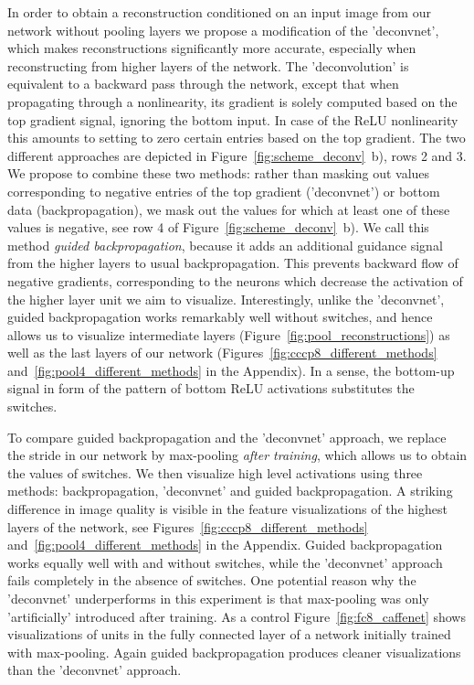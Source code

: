 \documentclass{article} \usepackage{iclr2015,times}
\begin{document}
In order to obtain a reconstruction conditioned on an input image from our network without pooling layers we propose a modification of the 'deconvnet', which makes reconstructions significantly more accurate, especially when reconstructing from higher layers of the network. The 'deconvolution' is equivalent to a backward pass through the network, except that when propagating through a nonlinearity, its gradient is solely computed based on the top gradient signal, ignoring the bottom input. In case of the ReLU nonlinearity this amounts to setting to zero certain entries based on the top gradient. The two different approaches are depicted in Figure~\ref{fig:scheme_deconv}~b), rows 2 and 3. We propose to combine these two methods: rather than masking out values corresponding to negative entries of the top gradient ('deconvnet') or bottom data (backpropagation), we mask out the values for which at least one of these values is negative, see row 4 of Figure~\ref{fig:scheme_deconv}~b). We call this method \emph{guided backpropagation}, because it adds an additional guidance signal from the higher layers to usual backpropagation. This prevents backward flow of negative gradients, corresponding to the neurons which decrease the activation of the higher layer unit we aim to visualize. Interestingly, unlike the 'deconvnet', guided backpropagation works remarkably well without switches, and hence allows us to visualize intermediate layers (Figure~\ref{fig:pool_reconstructions}) as well as the last layers of our network (Figures~\ref{fig:cccp8_different_methods} and~\ref{fig:pool4_different_methods} in the Appendix). In a sense, the bottom-up signal in form of the pattern of bottom ReLU activations substitutes the switches. 

To compare guided backpropagation and the 'deconvnet' approach, we replace the stride in our network by  max-pooling \emph{after training}, which allows us to obtain the values of switches. We then visualize high level activations using three methods: backpropagation, 'deconvnet' and guided backpropagation. A striking difference in image quality is visible in the feature visualizations of the highest layers of the network, see Figures~\ref{fig:cccp8_different_methods} and~\ref{fig:pool4_different_methods} in the Appendix. Guided backpropagation works equally well with and without switches, while the 'deconvnet' approach fails completely in the absence of switches. One potential reason why the 'deconvnet' underperforms in this experiment is that max-pooling was only 'artificially' introduced after training. As a control Figure~\ref{fig:fc8_caffenet} shows visualizations of units in the fully connected layer of a network initially trained with max-pooling. Again guided backpropagation produces cleaner visualizations than the 'deconvnet' approach.
\end{document}

